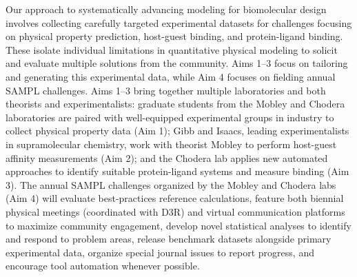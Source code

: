 \documentclass[11pt]{article}
\begin{document}
Our approach to systematically advancing modeling for biomolecular design involves collecting carefully targeted experimental datasets for challenges focusing on physical property prediction, host-guest binding, and protein-ligand binding.
These isolate individual limitations in quantitative physical modeling to solicit and evaluate multiple solutions from the community.
Aims 1--3 focus on tailoring and generating this experimental data, while Aim 4 focuses on fielding annual SAMPL challenges.
Aims 1--3 bring together multiple laboratories and both theorists and experimentalists: graduate students from the Mobley and Chodera laboratories are paired with well-equipped experimental groups in industry to collect physical property data (Aim 1); Gibb and Isaacs, leading experimentalists in supramolecular chemistry, work with theorist Mobley to perform host-guest affinity measurements (Aim 2); and the Chodera lab applies new automated approaches to identify suitable protein-ligand systems and measure binding (Aim 3).
The annual SAMPL challenges organized by the Mobley and Chodera labs (Aim 4) will evaluate best-practices reference calculations, feature both biennial physical meetings (coordinated with D3R) and virtual communication platforms to maximize community engagement, develop novel statistical analyses to identify and respond to problem areas, release benchmark datasets alongside primary experimental data, organize special journal issues to report progress, and encourage tool automation whenever possible.
\end{document}
